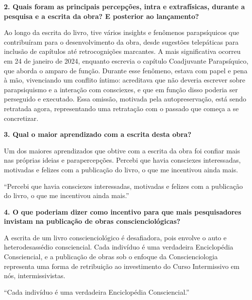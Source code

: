 \documentclass{gescons}
\begin{document}
\begin{multicols}{2}
\textbf{2. Quais foram as principais percepções, intra e extrafísicas, durante a pesquisa e a escrita da obra? E posterior ao lançamento?}

Ao longo da escrita do livro, tive vários insights e fenômenos parapsíquicos que contribuíram para o desenvolvimento da obra, desde sugestões telepáticas para inclusão de capítulos até retrocognições marcantes. A mais significativa ocorreu em 24 de janeiro de 2024, enquanto escrevia o capítulo Coadjuvante Parapsíquico, que aborda o amparo de função. Durante esse fenômeno, estava com papel e pena à mão, vivenciando um conflito íntimo: acreditava que não deveria escrever sobre parapsiquismo e a interação com consciexes, e que em função disso poderia ser perseguido e executado. Essa omissão, motivada pela autopreservação, está sendo retratada agora, representando uma retratação com o passado que começa a se concretizar.

\textbf{3. Qual o maior aprendizado com a escrita desta obra?}

Um dos maiores aprendizados que obtive com a escrita da obra foi confiar mais nas próprias ideias e parapercepções. Percebi que havia consciexes interessadas, motivadas e felizes com a publicação do livro, o que me incentivou ainda mais.

\begin{pullquote}
``Percebi que havia consciexes interessadas, motivadas e felizes com a publicação do livro, o que me incentivou ainda mais.''
\end{pullquote}

\textbf{4. O que poderiam dizer como incentivo para que mais pesquisadores invistam na publicação de obras conscienciológicas?}

A escrita de um livro conscienciológico é desafiadora, pois envolve o auto e heterodesassédio consciencial. Cada indivíduo é uma verdadeira Enciclopédia Consciencial, e a publicação de obras sob o enfoque da Conscienciologia representa uma forma de retribuição ao investimento do Curso Intermissivo em nós, intermissivistas.


\begin{pullquote}
``Cada indivíduo é uma verdadeira Enciclopédia Consciencial.''
\end{pullquote}

    
    \end{multicols}
\end{document}
